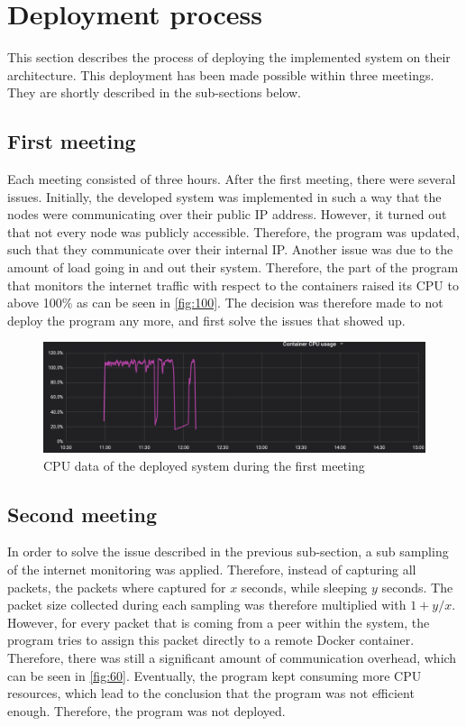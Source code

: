 \section{Deployment process} \label{sec:sb-process}
This section describes the process of deploying the implemented system on their architecture. This deployment has been made possible within three meetings. They are shortly described in the sub-sections below.

\subsection{First meeting}
Each meeting consisted of three hours. After the first meeting, there were several issues. Initially, the developed system was implemented in such a way that the nodes were communicating over their public IP address. However, it turned out that not every node was publicly accessible. Therefore, the program was updated, such that they communicate over their internal IP. Another issue was due to the amount of load going in and out their system. Therefore, the part of the program that monitors the internet traffic with respect to the containers raised its CPU to above 100\% as can be seen in \autoref{fig:100}.
The decision was therefore made to not deploy the program any more, and first solve the issues that showed up.

\begin{figure}
    \centering
    \includegraphics[width=\textwidth]{gfx/load-100.png}
    \caption{CPU data of the deployed system during the first meeting}
    \label{fig:100}
\end{figure}

\subsection{Second meeting}
In order to solve the issue described in the previous sub-section, a sub sampling of the internet monitoring was applied. Therefore, instead of capturing all packets, the packets where captured for $x$ seconds, while sleeping $y$ seconds. The packet size collected during each sampling was therefore multiplied with $1+y/x$. However, for every packet that is coming from a peer within the system, the program tries to assign this packet directly to a remote Docker container. Therefore, there was still a significant amount of communication overhead, which can be seen in \autoref{fig:60}. Eventually, the program kept consuming more CPU resources, which lead to the conclusion that the program was not efficient enough. Therefore, the program was not deployed.

